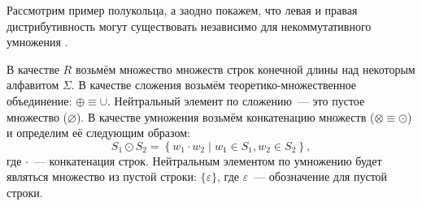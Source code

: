 \begin{example}
    \label{exmpl:semiring}
    Рассмотрим пример полукольца, а заодно покажем, что левая и правая дистрибутивность могут существовать независимо для некоммутативного умножения%
    .

    В качестве $R$ возьмём множество множеств строк конечной длины над некоторым алфавитом $\Sigma$.
    В качестве сложения возьмём теоретико-множественное объединение: $\oplus \equiv \cup$.
    Нейтральный элемент по сложению~--- это пустое множество ($\varnothing$).
    В качестве умножения возьмём конкатенацию множеств ($\otimes \equiv \odot$) и определим её следующим образом:
    \[S_1 \odot S_2 = \left\{ w_1 \cdot w_2 \mid w_1 \in S_1, w_2 \in S_2\right\},\]
    где $\cdot$~--- конкатенация строк.
    Нейтральным элементом по умножению будет являться множество из пустой строки: $\{\varepsilon\}$, где $\varepsilon$~--- обозначение для пустой строки.


\end{example}
